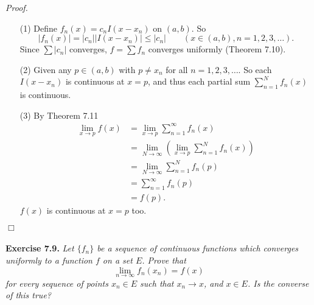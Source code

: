 \documentclass{article}
\begin{document}
\emph{Proof.}
\begin{enumerate}
\item[(1)]
Define $f_n(x) = c_n I(x-x_n)$ on $(a,b)$. So
\[
  |f_n(x)| = |c_n| |I(x-x_n)| \leq |c_n|
  \qquad
  (x \in (a,b), n = 1,2,3,\ldots).
\]
Since $\sum|c_n|$ converges, $f = \sum f_n$ converges uniformly (Theorem 7.10).

\item[(2)]
Given any $p \in (a,b)$ with $p \neq x_n$ for all $n=1,2,3,\ldots$.
So each $I(x-x_n)$ is continuous at $x=p$, and thus
each partial sum $\sum_{n=1}^{N} f_n(x)$ is continuous.

\item[(3)]
By Theorem 7.11
\begin{align*}
  \lim_{x \to p} f(x)
  &= \lim_{x \to p} \sum_{n=1}^{\infty} f_n(x) \\
  &= \lim_{N \to \infty} \left( \lim_{x \to p} \sum_{n=1}^{N} f_n(x) \right) \\
  &= \lim_{N \to \infty} \sum_{n=1}^{N} f_n(p) \\
  &= \sum_{n=1}^{\infty} f_n(p) \\
  &= f(p).
\end{align*}
$f(x)$ is continuous at $x=p$ too.
\end{enumerate}
$\Box$ \\\\






\textbf{Exercise 7.9.}
\emph{Let $\{f_n\}$ be a sequence of continuous functions
which converges uniformly to a function $f$ on a set $E$.
Prove that
\[
  \lim_{n \to \infty} f_n(x_n) = f(x)
\]
for every sequence of points $x_n \in E$ such that $x_n \to x$,
and $x \in E$.
Is the converse of this true?} \\
\end{document}
